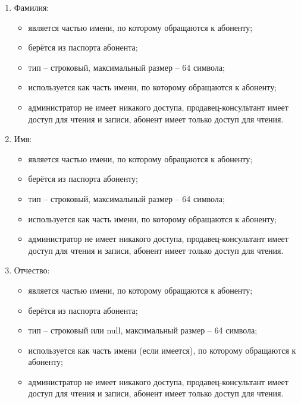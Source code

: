 \begin{enumerate}
\begin{enumerate}
        \item Фамилия:
        \begin{itemize}
            \item является частью имени, по которому обращаются к абоненту;
            \item берётся из паспорта абонента;
            \item тип -- строковый, максимальный размер -- 64 символа;
            \item используется как часть имени, по которому обращаются к абоненту;
            \item администратор не имеет никакого доступа, продавец-консультант имеет доступ для чтения и записи, абонент имеет только доступ для чтения.
        \end{itemize}

        \item Имя:
        \begin{itemize}
            \item является частью имени, по которому обращаются к абоненту;
            \item берётся из паспорта абоненту;
            \item тип -- строковый, максимальный размер -- 64 символа;
            \item используется как часть имени, по которому обращаются к абоненту;
            \item администратор не имеет никакого доступа, продавец-консультант имеет доступ для чтения и записи, абонент имеет только доступ для чтения.
        \end{itemize}

        \item Отчество:
        \begin{itemize}
            \item является частью имени, по которому обращаются к абоненту;
            \item берётся из паспорта абонента;
            \item тип -- строковый или null, максимальный размер -- 64 символа;
            \item используется как часть имени (если имеется), по которому обращаются к абоненту;
            \item администратор не имеет никакого доступа, продавец-консультант имеет доступ для чтения и записи, абонент имеет только доступ для чтения.
        \end{itemize}


\end{enumerate}
\end{enumerate}
